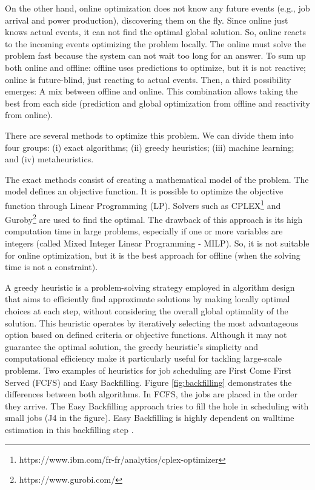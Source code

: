 On the other hand, online optimization does not know any future events (e.g., job arrival and power production), discovering them on the fly. Since online just knows actual events, it can not find the optimal global solution. So, online reacts to the incoming events optimizing the problem locally. The online must solve the problem fast because the system can not wait too long for an answer. To sum up both online and offline: offline uses predictions to optimize, but it is not reactive; online is future-blind, just reacting to actual events. Then, a third possibility emerges: A mix between offline and online. This combination allows taking the best from each side (prediction and global optimization from offline and reactivity from online).

There are several methods to optimize this problem. We can divide them into four groups: (i) exact algorithms; (ii) greedy heuristics; (iii) machine learning; and (iv) metaheuristics.

The exact methods consist of creating a mathematical model of the problem. The model defines an objective function. It is possible to optimize the objective function through Linear Programming (LP). Solvers such as CPLEX\footnote{https://www.ibm.com/fr-fr/analytics/cplex-optimizer} and Guroby\footnote{https://www.gurobi.com/} are used to find the optimal. The drawback of this approach is its high computation time in large problems, especially if one or more variables are integers (called Mixed Integer Linear Programming - MILP). So, it is not suitable for online optimization, but it is the best approach for offline (when the solving time is not a constraint). 

A greedy heuristic is a problem-solving strategy employed in algorithm design that aims to efficiently find approximate solutions by making locally optimal choices at each step, without considering the overall global optimality of the solution. This heuristic operates by iteratively selecting the most advantageous option based on defined criteria or objective functions. Although it may not guarantee the optimal solution, the greedy heuristic's simplicity and computational efficiency make it particularly useful for tackling large-scale problems. Two examples of heuristics for job scheduling are First Come First Served (FCFS) and Easy Backfilling. Figure \ref{fig:backfilling} demonstrates the differences between both algorithms. In FCFS, the jobs are placed in the order they arrive. The Easy Backfilling approach tries to fill the hole in scheduling with small jobs (J4 in the figure). Easy Backfilling is highly dependent on walltime estimation in this backfilling step \cite{srinivasan2002characterization, takizawa2020effect}.

